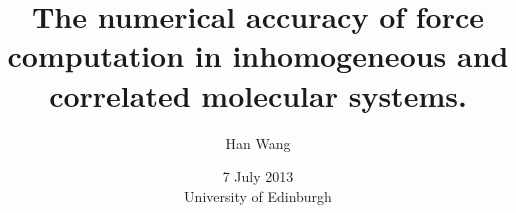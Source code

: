 \documentclass{beamer}
\newcommand{\redc}[1]{{\color{red} #1}}
\begin{document}
\title[]{
  The numerical accuracy of force computation in inhomogeneous and correlated molecular systems.
}
%
\author{Han Wang}
\date[7 July 2013]{7 July 2013\\University of Edinburgh}
\frame{\titlepage}

\end{document}
